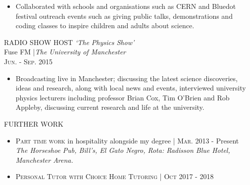 \documentclass[a4paper,10pt]{article}
\begin{document}
\begin{itemize}[leftmargin=*,topsep=0pt,noitemsep,parsep=0pt,partopsep=0pt,rightmargin=0.5cm]
\setlength\itemsep{0em}

    \item Collaborated with schools and organisations such as CERN and Bluedot festival outreach events such as giving public talks, demonstrations and coding classes to inspire children and adults about science.

\end{itemize}

RADIO SHOW HOST \textit{`The Physics Show'} \\Fuse FM
|\small\emph{The University of Manchester} 
\\\textsc{Jun. - Sep.} 2015
\vspace{0.1mm}
 
\begin{itemize}[leftmargin=*,topsep=0pt,noitemsep,parsep=0pt,partopsep=0pt,rightmargin=0.5cm]
\setlength\itemsep{0em}

    \item Broadcasting live in Manchester; discussing the latest science discoveries, ideas and research, along with local news and events, interviewed university physics lecturers including professor Brian Cox, Tim O’Brien and Rob Appleby, discussing current research and life at the university.

\end{itemize}

\textsc{FURTHER WORK}
\begin{itemize}[leftmargin=*,topsep=0pt,noitemsep,parsep=0pt,partopsep=0pt,rightmargin=0.5cm]
\item \vspace{0.1mm} \textsc{Part time work} in hospitality alongside my degree | \textsc{Mar. } 2013 - Present \\
\footnotesize\emph{The Horseshoe Pub, Bill's, El Gato Negro, Rota: Radisson Blue Hotel, Manchester Arena.}
\item \vspace{0.1mm} \textsc{Personal Tutor with Choice Home Tutoring} | \textsc{Oct } 2017 - 2018
\end{itemize}
\end{document}

